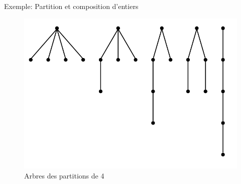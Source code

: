 \documentclass{beamer}
\begin{document}



\begin{frame}{Exemple: Partition et composition d'entiers}
\begin{figure}[h]
  \centering
  \includegraphics[scale=0.3]{chart1.png}
  \caption{Arbres des partitions de 4}
  \end{figure}
\end{frame}
\end{document}
